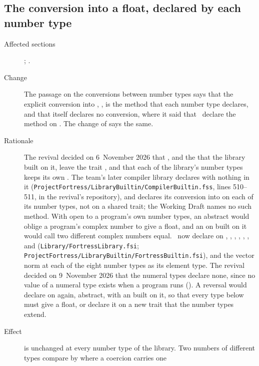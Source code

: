 \subsection{The conversion into a float, declared by each number type}

\begin{description}
\item[Affected sections] ; .
\item[Change] The passage on the conversions between number types says that
the explicit conversion into , , is the
method that each number type declares, and that  itself declares
no conversion, where it said that \library\ declare the method on
.
The change of  says the same.
\item[Rationale] The revival decided on 6~November 2026 that , and
the \EXP{=} that the library built on it, leave the trait , and that
each of the library's number types keeps its own .
The team's later compiler library declares  with nothing in it
(\nolinkurl{ProjectFortress/LibraryBuiltin/CompilerBuiltin.fss}, lines
510--511, in the revival's repository), and declares its conversion into
 on each of its number types, not on a shared trait; the
Working Draft names no such method.
With  open to a program's own number types, an abstract
 would oblige a program's complex number to give a float, and an
\EXP{=} on  built on it would call two different complex numbers
equal.
\Library\ now declare  on , ,
, , , ,
 and 
(\nolinkurl{Library/FortressLibrary.fsi};
\nolinkurl{ProjectFortress/LibraryBuiltin/FortressBuiltin.fsi}), and the vector
norm at each of the eight number types as its element type.
The revival decided on 9~November 2026 that the numeral types declare none,
since no value of a numeral type exists when a program runs
().
A reversal would declare  on  again, abstract, with an
\EXP{=} built on it, so that every type below  must give a float, or
declare it on a new trait that the number types extend.
\item[Effect]  is unchanged at every number type of the
library.
Two numbers of different types compare by \EXP{=} where a coercion carries one

\end{description}
